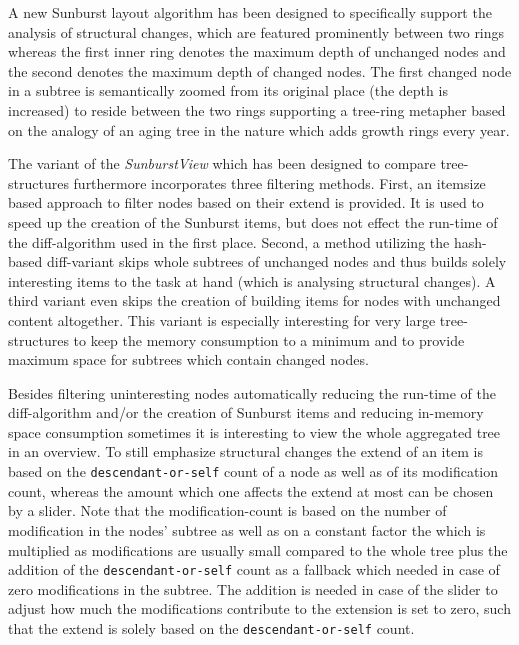 A new Sunburst layout algorithm has been designed to specifically support the analysis of structural changes, which are featured prominently between two rings whereas the first inner ring denotes the maximum depth of unchanged nodes and the second denotes the maximum depth of changed nodes. The first changed node in a subtree is semantically zoomed from its original place (the depth is increased) to reside between the two rings supporting a tree-ring metapher based on the analogy of an aging tree in the nature which adds growth rings every year.

The variant of the \emph{SunburstView} which has been designed to compare tree-structures furthermore incorporates three filtering methods. First, an itemsize based approach to filter nodes based on their extend is provided. It is used to speed up the creation of the Sunburst items, but does not effect the run-time of the diff-algorithm used in the first place. Second, a method utilizing the hash-based diff-variant skips whole subtrees of unchanged nodes and thus builds solely interesting items to the task at hand (which is analysing structural changes). A third variant even skips the creation of building items for nodes with unchanged content altogether. This variant is especially interesting for very large tree-structures to keep the memory consumption to a minimum and to provide maximum space for subtrees which contain changed nodes.

Besides filtering uninteresting nodes automatically reducing the run-time of the diff-algorithm and/or the creation of Sunburst items and reducing in-memory space consumption sometimes it is interesting to view the whole aggregated tree in an overview. To still emphasize structural changes the extend of an item is based on the \texttt{descendant-or-self} count of a node as well as of its modification count, whereas the amount which one affects the extend at most can be chosen by a slider. Note that the modification-count is based on the number of modification in the nodes' subtree as well as on a constant factor the which is multiplied as modifications are usually small compared to the whole tree plus the addition of the \texttt{descendant-or-self} count as a fallback which needed in case of zero modifications in the subtree. The addition is needed in case of the slider to adjust how much the modifications contribute to the extension is set to zero, such that the extend is solely based on the \texttt{descendant-or-self} count.

